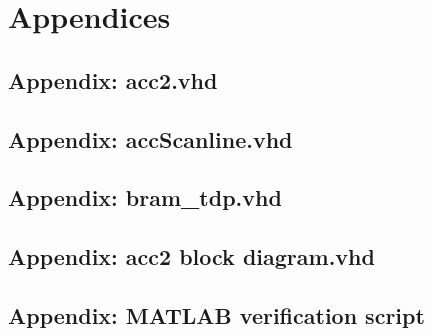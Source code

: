 \appendix
\renewcommand{\thesection}{\Alph{section}}
\newpage
\section{Appendices}

\subsection{Appendix: acc2.vhd}
\label{app:acc2}		


\newpage
\subsection{Appendix: accScanline.vhd}
\label{app:accScanline}		


\newpage
\subsection{Appendix: bram\_tdp.vhd}
\label{app:bram}	


\newpage
\subsection{Appendix: acc2 block diagram.vhd}
\label{app:accBlockDiagram}


\newpage
\subsection{Appendix: MATLAB verification script}
\label{app:Matlab}
\lstset{language=Matlab} 
